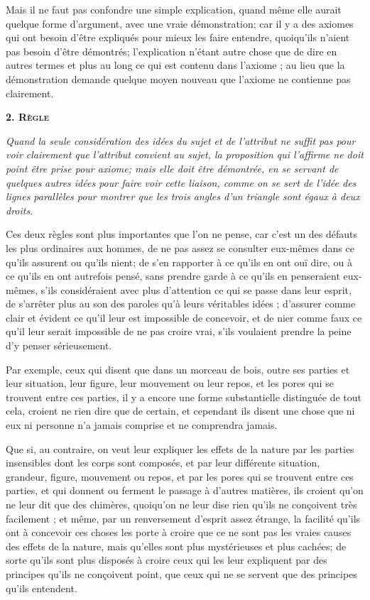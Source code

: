 Mais il ne faut pas confondre une simple explication, quand même elle aurait quelque forme d'argument, avec une vraie démonstration; car il y a des axiomes qui ont besoin d'être expliqués pour mieux les faire entendre, quoiqu'ils n'aient pas besoin d'être démontrés; l'explication n'étant autre chose que de dire en autres termes et plus au long ce qui est contenu dans l'axiome ; au lieu que la démonstration demande quelque moyen nouveau que l'axiome ne contienne pas clairement.

\begin{center}{\scshape\bfseries\large 2. Règle}\end{center}

	\emph{Quand la seule considération des idées du sujet et de l'attribut ne suffit pas pour voir clairement que l'attribut convient au sujet, la proposition qui l'affirme ne doit point être prise pour axiome; mais elle doit être démontrée, en se servant de quelques autres idées pour faire voir cette liaison, comme on se sert de l'idée des lignes parallèles pour montrer que les trois angles d'un triangle sont égaux à deux droits}.

Ces deux règles sont plus importantes que l'on ne pense, car c'est un des défauts les plus ordinaires aux hommes, de ne pas assez se consulter eux-mêmes dans ce qu'ils assurent ou qu'ils nient; de s'en rapporter à ce qu'ils en ont ouï dire, ou à ce qu'ils en ont autrefois pensé, sans prendre garde à ce qu'ils en penseraient eux-mêmes, s'ils considéraient avec plus d'attention ce qui se passe dans leur esprit, de s'arrêter plus au son des paroles qu'à leurs véritables idées ; d'assurer comme clair et évident ce qu'il leur est impossible de concevoir, et de nier comme faux ce qu'il leur serait impossible de ne pas croire vrai, s'ils voulaient prendre la peine d'y penser sérieusement.

Par exemple, ceux qui disent que dans un morceau de bois, outre ses parties et leur situation, leur figure, leur mouvement ou leur repos, et les pores qui se trouvent entre ces parties, il y a encore une forme substantielle distinguée de tout cela, croient ne rien dire que de certain, et cependant ils disent une chose que ni eux ni personne n'a jamais comprise et ne comprendra jamais.

Que si, au contraire, on veut leur expliquer les effets de la nature par les parties insensibles dont les corps sont composés, et par leur différente situation, grandeur, figure, mouvement ou repos, et par les pores qui se trouvent entre ces parties, et qui donnent ou ferment le passage à d'autres matières, ils croient qu'on ne leur dit que des chimères, quoiqu'on ne leur dise rien qu'ils ne conçoivent très facilement ; et même, par un renversement d'esprit assez étrange, la facilité qu'ils ont à concevoir ces choses les porte à croire que ce ne sont pas les vraies causes des effets de la nature, mais qu'elles sont plus mystérieuses et plus cachées; de sorte qu'ils sont plus disposés à croire ceux qui les leur expliquent par des principes qu'ils ne conçoivent point, que ceux qui ne se servent que des principes qu'ils entendent.

